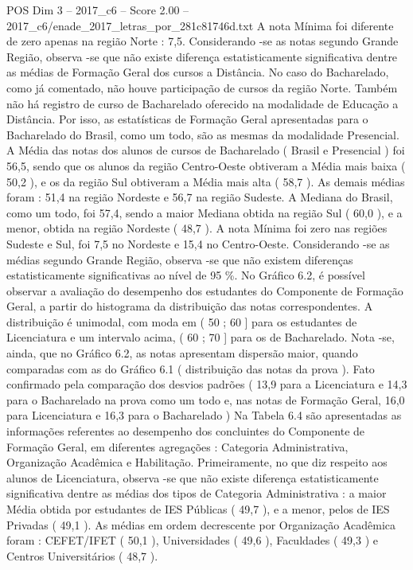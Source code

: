 \begin{textsample}{POS Dim 3 – 2017\_c6 – Score 2.00 – 2017\_c6/enade\_2017\_letras\_por\_281c81746d.txt}
A nota Mínima foi diferente de zero apenas na região Norte : 7,5.
Considerando -se as notas segundo Grande Região, observa -se que não existe diferença estatisticamente significativa dentre as médias de Formação Geral dos cursos a Distância.
No caso do Bacharelado, como já comentado, não houve participação de cursos da região Norte.
Também não há registro de curso de Bacharelado oferecido na modalidade de Educação a Distância.
Por isso, as estatísticas de Formação Geral apresentadas para o Bacharelado do Brasil, como um todo, são as mesmas da modalidade Presencial.
A Média das notas dos alunos de cursos de Bacharelado ( Brasil e Presencial ) foi 56,5, sendo que os alunos da região Centro-Oeste obtiveram a Média mais baixa ( 50,2 ), e os da região Sul obtiveram a Média mais alta ( 58,7 ).
As demais médias foram : 51,4 na região Nordeste e 56,7 na região Sudeste.
A Mediana do Brasil, como um todo, foi 57,4, sendo a maior Mediana obtida na região Sul ( 60,0 ), e a menor, obtida na região Nordeste ( 48,7 ).
A nota Mínima foi zero nas regiões Sudeste e Sul, foi 7,5 no Nordeste e 15,4 no Centro-Oeste.
Considerando -se as médias segundo Grande Região, observa -se que não existem diferenças estatisticamente significativas ao nível de 95 \%.
No Gráfico 6.2, é possível observar a avaliação do desempenho dos estudantes do Componente de Formação Geral, a partir do histograma da distribuição das notas correspondentes.
A distribuição é unimodal, com moda em ( 50 ; 60 ] para os estudantes de Licenciatura e um intervalo acima, ( 60 ; 70 ] para os de Bacharelado.
Nota -se, ainda, que no Gráfico 6.2, as notas apresentam dispersão maior, quando comparadas com as do Gráfico 6.1 ( distribuição das notas da prova ).
Fato confirmado pela comparação dos desvios padrões ( 13,9 para a Licenciatura e 14,3 para o Bacharelado na prova como um todo e, nas notas de Formação Geral, 16,0 para Licenciatura e 16,3 para o Bacharelado ) Na Tabela 6.4 são apresentadas as informações referentes ao desempenho dos concluintes do Componente de Formação Geral, em diferentes agregações : Categoria Administrativa, Organização Acadêmica e Habilitação.
Primeiramente, no que diz respeito aos alunos de Licenciatura, observa -se que não existe diferença estatisticamente significativa dentre as médias dos tipos de Categoria Administrativa : a maior Média obtida por estudantes de IES Públicas ( 49,7 ), e a menor, pelos de IES Privadas ( 49,1 ).
As médias em ordem decrescente por Organização Acadêmica foram : CEFET/IFET ( 50,1 ), Universidades ( 49,6 ), Faculdades ( 49,3 ) e Centros Universitários ( 48,7 ).

\end{textsample}
